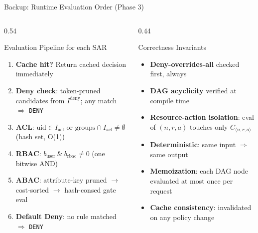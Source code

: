 \documentclass[aspectratio=169,10pt]{beamer}
\newcommand{\tightitems}{%
  \setlength{\topsep}{1pt}%
  \setlength{\itemsep}{2pt}%
  \setlength{\parsep}{0pt}%
  \setlength{\parskip}{0pt}%
}
\begin{document}

\begin{frame}[t,noframenumbering]{Backup: Runtime Evaluation Order (Phase 3)}
\vspace{3pt}
\begin{columns}[T,onlytextwidth]
\begin{column}{0.54\textwidth}
\begin{callout}{Evaluation Pipeline for each SAR}
\begin{enumerate}\tightitems
\item \textbf{Cache hit?} Return cached decision immediately
\item \textbf{Deny check}: token-pruned candidates from $I^{\mathrm{deny}}$; any match $\Rightarrow$ \texttt{DENY}
\item \textbf{ACL}: $\mathrm{uid} \in I_{\mathrm{acl}}$ or $\mathrm{groups} \cap I_{\mathrm{acl}} \neq \emptyset$ (hash set, O(1))
\item \textbf{RBAC}: $b_{\mathrm{user}}\ \&\ b_{\mathrm{rbac}} \neq 0$ (one bitwise AND)
\item \textbf{ABAC}: attribute-key pruned $\to$ cost-sorted $\to$ hash-consed gate eval
\item \textbf{Default Deny}: no rule matched $\Rightarrow$ \texttt{DENY}
\end{enumerate}
\end{callout}
\end{column}
\begin{column}{0.44\textwidth}
\begin{callout}{Correctness Invariants}
\begin{itemize}\tightitems
\item \textbf{Deny-overrides-all} checked first, always
\item \textbf{DAG acyclicity} verified at compile time
\item \textbf{Resource-action isolation}: eval of $(n,r,a)$ touches only $C_{\langle n,r,a\rangle}$
\item \textbf{Deterministic}: same input $\Rightarrow$ same output
\item \textbf{Memoization}: each DAG node evaluated at most once per request
\item \textbf{Cache consistency}: invalidated on any policy change
\end{itemize}
\end{callout}
\end{column}
\end{columns}
\end{frame}
\end{document}
